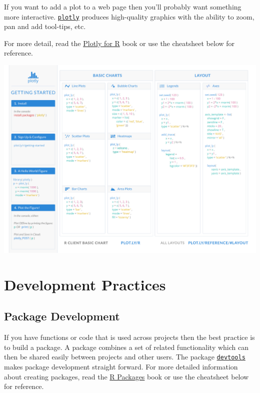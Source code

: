 \documentclass[]{book}
\begin{document}
If you want to add a plot to a web page then you'll probably want something more interactive.
\href{https://plot.ly/r/}{\texttt{plotly}} produces high-quality graphics with the ability to zoom, pan and
add tool-tips, etc.

For more detail, read the \href{https://plotly-book.cpsievert.me/}{Plotly for R} book or use the
cheatsheet below for reference.

\href{https://images.plot.ly/plotly-documentation/images/r_cheat_sheet.pdf}{\includegraphics{images/plotly.png}}

\hypertarget{development}{%
\chapter{Development Practices}\label{development}}

\hypertarget{package-development}{%
\section{Package Development}\label{package-development}}

If you have functions or code that is used across projects then the best practice is to build a
package. A package combines a set of related functionality which can then be shared easily
between projects and other users. The package \href{http://devtools.r-lib.org/}{\texttt{devtools}} makes
package development straight forward. For more detailed information about creating packages, read
the \href{http://r-pkgs.had.co.nz/}{R Packages} book or use the cheatsheet below for reference.
\end{document}
